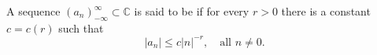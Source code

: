 \begin{definition}
A sequence $(a_n)_{-\infty}^{\infty} \subset \mathbb{C}$ is said to be  if for every $r > 0$ there is a constant $c = c(r)$ such that
$$|a_n| \leq c|n|^{-r}, \quad \text{all } n \neq 0.$$
\end{definition}
